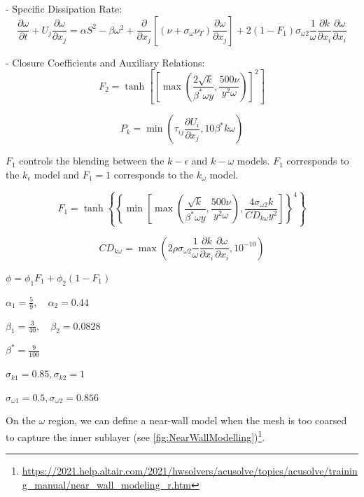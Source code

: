 - Specific Dissipation Rate:
\begin{equation}
    \frac{\partial \omega}{\partial t} + U_j \frac{\partial \omega}{\partial x_j} = \alpha S^2 - \beta \omega^2 + \frac{\partial}{\partial x_j} \left[ \left( \nu + \sigma_{\omega} \nu_T \right) \frac{\partial \omega}{\partial x_j} \right] + 2(1 - F_1)\sigma_{\omega 2} \frac{1}{\omega} \frac{\partial k}{\partial x_i} \frac{\partial \omega}{\partial x_i}
\end{equation}


- Closure Coefficients and Auxiliary Relations:
\begin{equation}
    F_2 = \tanh \left[ \left[ \max \left( \frac{2\sqrt{k}}{\beta^* \omega y}, \frac{500 \nu}{y^2 \omega} \right) \right]^2 \right]
\end{equation}

\begin{equation}
    P_k = \min \left( \tau_{ij} \frac{\partial U_i}{\partial x_j}, 10\beta^* k \omega \right)
\end{equation}

$F_1$ controls the blending between the $k-\epsilon$ and $k-\omega$ models. $F_1$ corresponds to the $k_\epsilon$ model and $F_1 = 1$ corresponds to the $k_\omega$ model.

\begin{equation}
    F_1 = \tanh \left\{ \left\{ \min \left[ \max \left( \frac{\sqrt{k}}{\beta^* \omega y}, \frac{500 \nu}{y^2 \omega} \right), \frac{4 \sigma_{\omega 2} k}{CD_{k\omega} y^2} \right] \right\}^4 \right\}
\end{equation}

\begin{equation}
    CD_{k\omega} = \max \left( 2\rho \sigma_{\omega 2} \frac{1}{\omega} \frac{\partial k}{\partial x_i} \frac{\partial \omega}{\partial x_i}, 10^{-10} \right)
\end{equation}

$\phi = \phi_1 F_1 + \phi_2 (1 - F_1)$

$\alpha_1 = \frac{5}{9}, \quad \alpha_2 = 0.44$

$\beta_1 = \frac{3}{40}, \quad \beta_2 = 0.0828$

$\beta^* = \frac{9}{100}$

$\sigma_{k1}  = 0.85,  \sigma_{k2}  = 1$

$\sigma_{\omega 1}  = 0.5,  \sigma_{\omega 2}  = 0.856$


On the $\omega$ region, we can define a near-wall model when the mesh is too coarsed to capture the inner sublayer (see \autoref{fig:NearWallModelling})\footnote{\url{https://2021.help.altair.com/2021/hwsolvers/acusolve/topics/acusolve/training_manual/near_wall_modeling_r.htm}}.

